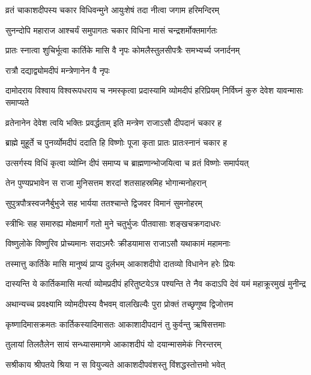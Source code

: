 \twolineshloka
{व्रतं चाकाशदीपस्य चकार विधिवन्मुने}
{आयुःशेषं तदा नीत्वा जगाम हरिमन्दिरम्} %

\twolineshloka
{सुनन्दोपि महाराज आश्चर्यं समुपागतः}
{चकार विधिना मासं चन्द्रशर्मोक्तमार्गतः} %

\twolineshloka
{प्रातः स्नात्वा शुचिर्भूत्वा कार्तिके मासि वै नृपः}
{कोमलैस्तुलसीपत्रैः समभ्यर्च्य जनार्दनम्} %


\onelineshloka
{रात्रौ दद्याद्व्योमदीपं मन्त्रेणानेन वै नृपः} %

\threelineshloka
{दामोदराय विश्वाय विश्वरूपधराय च}
{नमस्कृत्वा प्रदास्यामि व्योमदीपं हरिप्रियम्}
{निर्विघ्नं कुरु देवेश यावन्मासः समाप्यते} %

\twolineshloka
{व्रतेनानेन देवेश त्वयि भक्तिः प्रवर्द्धताम्}
{इति मन्त्रेण राजाऽसौ दीपदानं चकार ह} %

\twolineshloka
{ब्राह्मे मुहूर्ते च पुनर्व्योमदीपं ददाति हि}
{विष्णोः पूजा कृता प्रातः प्रातःस्नानं चकार ह} %

\twolineshloka
{उत्सर्गस्य विधिं कृत्वा व्योम्नि दीपं समाप्य च}
{ब्राह्मणान्भोजयित्वा च व्रतं विष्णोः समार्पयत्} %

\twolineshloka
{तेन पुण्यप्रभावेन स राजा मुनिसत्तम}
{शरदां शतसाहस्रमिह भोगान्मनोहरान्} %

\twolineshloka
{सुपुत्रपौत्रस्वजनैर्बुभुजे सह भार्यया}
{ततश्चान्ते द्विजवर विमानं सुमनोहरम्} %

\twolineshloka
{स्त्रीभिः सह समारुह्य मोक्षमार्गं गतो मुने}
{चतुर्भुजः पीतवासाः शङ्खचक्रगदाधरः} %

\twolineshloka
{विष्णुलोके विष्णुरिव प्रोच्यमानः सदाऽमरैः}
{क्रीडयामास राजाऽसौ यथाकामं महामनाः} %

\twolineshloka
{तस्मात्तु कार्तिके मासि मानुष्यं प्राप्य दुर्लभम्}
{आकाशदीपो दातव्यो विधानेन हरेः प्रियः} %

\twolineshloka
{दास्यन्ति ये कार्तिकमासि मर्त्या व्योमप्रदीपं हरितुष्टयेऽत्र}
{पश्यन्ति ते नैव कदाऽपि देवं यमं महाक्रूरमुखं मुनीन्द्र} %

\twolineshloka
{अथान्यच्च प्रवक्ष्यामि व्योमदीपस्य वैभवम्}
{वालखिल्यैः पुरा प्रोक्तं तच्छृणुष्व द्विजोत्तम} %


\twolineshloka
{कृष्णादिमासक्रमतः कार्तिकस्यादिमासतः}
{आकाशादीपदानं तु कुर्वन्तु ऋषिसत्तमाः} %

\twolineshloka
{तुलायां तिलतैलेन सायं सन्ध्यासमागमे}
{आकाशदीपं यो दयान्मासमेकं निरन्तरम्} %

\twolineshloka
{सश्रीकाय श्रीपतये श्रिया न स वियुज्यते}
{आकाशदीपवंशस्तु विंशद्धस्तोत्तमो भवेत्} %

